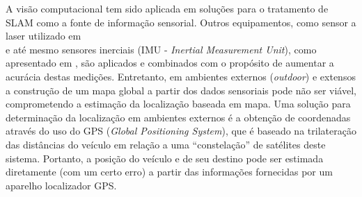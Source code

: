 A visão computacional tem sido aplicada em soluções para o tratamento de SLAM
como a fonte de informação sensorial. Outros equipamentos, como sensor a laser
utilizado em \\\cite{Lategahn2011} e até mesmo sensores inerciais (IMU -
\textit{Inertial Measurement Unit}), como apresentado em \cite{FootSLAM}, são
aplicados e combinados com o propósito de aumentar a acurácia destas medições.
Entretanto, em ambientes externos (\textit{outdoor}) e extensos a construção de
um mapa global a partir dos dados sensoriais pode não ser viável, comprometendo
a estimação da localização baseada em mapa.
Uma solução para determinação da localização em ambientes externos é a obtenção
de coordenadas através do uso do GPS (\textit{Global Positioning System}), que é
baseado na trilateração das distâncias do veículo em relação a uma “constelação”
de satélites deste sistema. Portanto, a posição do veículo e de seu destino pode
ser estimada diretamente (com um certo erro) a partir das informações fornecidas
por um aparelho localizador GPS.





